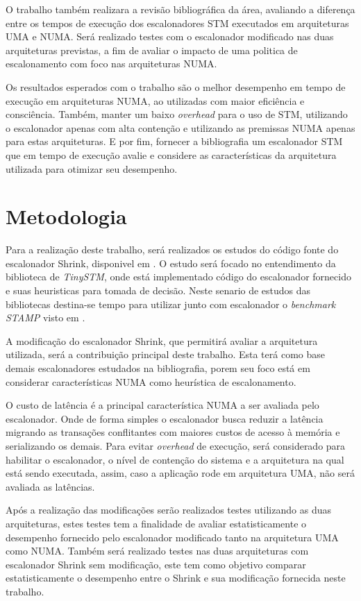 \documentclass[diss-proposta,nocipinfo]{texufpel}
\begin{document}
O trabalho também realizara a revisão bibliográfica da área, avaliando a diferença entre os tempos de execução dos escalonadores STM executados em arquiteturas UMA e NUMA. Será realizado testes com o escalonador modificado nas duas arquiteturas previstas, a fim de avaliar o impacto de uma politica de escalonamento com foco nas arquiteturas NUMA.

Os resultados esperados com o trabalho são o melhor desempenho em tempo de execução em arquiteturas NUMA, ao utilizadas com maior eficiência e consciência. Também, manter um baixo \emph{overhead} para o uso de STM, utilizando o escalonador apenas com alta contenção e utilizando as premissas NUMA apenas para estas arquiteturas. E por fim, fornecer a bibliografia um escalonador STM que em tempo de execução avalie e considere as características da arquitetura utilizada para otimizar seu desempenho.

\chapter{Metodologia}

Para a realização deste trabalho, será realizados os estudos do código fonte do escalonador Shrink, disponivel em \cite{shrink09}. O estudo será focado no entendimento da biblioteca de \emph{TinySTM}, onde está implementado código do escalonador fornecido e suas heuristicas para tomada de decisão. Neste senario de estudos das bibliotecas destina-se tempo para utilizar junto com escalonador o \emph{benchmark STAMP} visto em \cite{STAMP}.

A modificação do escalonador Shrink, que permitirá avaliar a arquitetura utilizada, será a contribuição principal deste trabalho. Esta terá como base demais escalonadores estudados na bibliografia, porem seu foco está em considerar características NUMA como heurística de escalonamento.

O custo de latência é a principal característica NUMA a ser avaliada pelo escalonador. Onde de forma simples o escalonador busca reduzir a latência migrando as transações conflitantes com maiores custos de acesso à memória e serializando os demais. Para evitar \emph{overhead} de execução, será considerado para habilitar o escalonador, o nível de contenção do sistema e a arquitetura na qual está sendo executada, assim, caso a aplicação rode em arquitetura UMA, não será avaliada as latências.

Após a realização das modificações serão realizados testes utilizando as duas arquiteturas, estes testes tem a finalidade de avaliar estatisticamente o desempenho fornecido pelo escalonador modificado tanto na arquitetura UMA como NUMA. Também será realizado testes nas duas arquiteturas com escalonador Shrink sem modificação, este tem como objetivo comparar estatisticamente o desempenho entre o Shrink e sua modificação fornecida neste trabalho.
\end{document}
